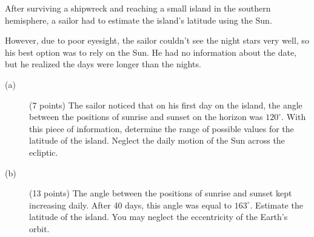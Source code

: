 After surviving a shipwreck and reaching a small island in the southern
hemisphere, a sailor had to estimate the island's latitude using the Sun.

However, due to poor eyesight, the sailor couldn't see the night stars very
well, so his best option was to rely on the Sun. He had no information about
the date, but he realized the days were longer than the nights.

\begin{description}
\item[(a)] (7 points) The sailor noticed that on his first day on the island,
  the angle between the positions of sunrise and sunset on the horizon was
  $120^\circ$. With this piece of information, determine the range of possible
  values for the latitude of the island. Neglect the daily motion of the Sun
  across the ecliptic.
\item[(b)] (13 points) The angle between the positions of sunrise and sunset
  kept increasing daily. After 40 days, this angle was equal to $163^\circ$.
  Estimate the latitude of the island. You may neglect the eccentricity of the
  Earth's orbit.
\end{description}
